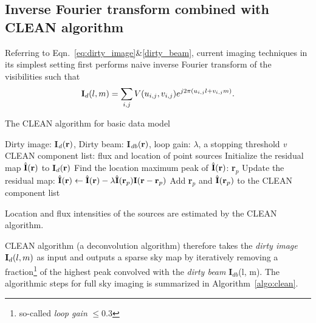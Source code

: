 \documentclass{article}
\begin{document}
\subsection{Inverse Fourier transform combined with CLEAN algorithm}
Referring to Eqn.~\ref{eq:dirty_image}\&\ref{dirty_beam}, current imaging techniques in its simplest setting first performs naive inverse Fourier transform of the visibilities such that
\begin{equation}
{\bf I}_{d}(l, m) = \sum_{i, j} V(u_{i, j}, v_{i, j})e^{j2\pi (u_{i, j}l+v_{i, j}m)}.
\end{equation}

\begin{algorithm}[t]
   \caption{The CLEAN algorithm for basic data model}
   \label{algo:clean}
\begin{algorithmic}
    {Dirty image: {\bf I}${}_{d}({\bf r})$, Dirty beam: {\bf I}${}_{db}({\bf r})$, loop gain: $\lambda$, a stopping threshold {\it v}} 
    CLEAN component list: flux and location of point sources
   \REPEAT 
   \STATE Initialize the residual map $\hat{\bf I}({\bf r})$ to {\bf I}${}_{d}({\bf r})$
   \STATE Find the location maximum peak of $\hat{\bf I}({\bf r})$: {\bf r${}_p$}
   \STATE  Update the residual map: $\hat{\bf I}({\bf r}) \leftarrow \hat{\bf I}({\bf r}) - \lambda \hat{\bf I}({\bf r}_p) {\bf I}({\bf r}-{\bf r}_p)$
   \STATE Add {\bf r}${}_p$ and $\hat{\bf I}({\bf r}_p)$ to the CLEAN component list
   \ENDFOR
\end{algorithmic}
\end{algorithm}
Location and flux intensities of the sources are estimated by the CLEAN algorithm.

CLEAN algorithm (a deconvolution algorithm) therefore takes the {\it dirty image} ${\bf I}_d(l, m)$ as input and outputs a sparse sky map by iteratively removing a fraction\footnote{so-called {\it loop gain} $\leq 0.3$} of the highest peak convolved with the {\it dirty beam} {\bf I}${}_{db}$(l, m). The algorithmic steps for full sky imaging is summarized in Algorithm~\ref{algo:clean}.
\end{document}
